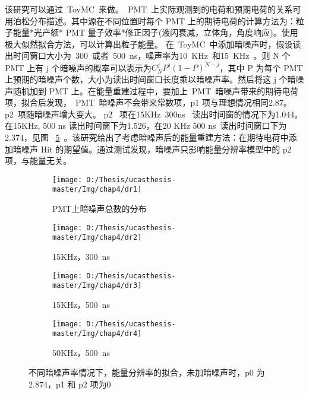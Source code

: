 该研究可以通过~ToyMC~来做。~PMT~上实际观测到的电荷和预期电荷的关系可用泊松分布描述。其中源在不同位置时每个 PMT 上的期待电荷的计算方法为：粒子能量*光产额* PMT 量子效率*修正因子(液闪衰减，立体角，角度响应)。使用极大似然拟合方法，可以计算出粒子能量。
在~ToyMC~中添加暗噪声时，假设读出时间窗口大小为~300~或者~500~ns，噪声率为10~KHz~和15~KHz~。则 N 个 PMT 上有 j 个暗噪声的概率可以表示为$C_N^jP^j(1-P)^{N-j}$，其中 P 为每个 PMT 上预期的暗噪声个数，大小为读出时间窗口长度乘以暗噪声率。然后将这 j 个暗噪声随机加到 PMT 上。在能量重建过程中，要加上~PMT~暗噪声带来的期待电荷项，拟合后发现，~PMT~暗噪声不会带来常数项，p1 项与理想情况相同2.87。 p2~项随暗噪声增大变大。 p2~ 项在15KHz~300ns~ 读出时间窗的情况下为1.044。在15KHz, 500 ns 读出时间窗下为1.526，在20 KHz 500 ns~读出时间窗口下为2.374，见图 ~\ref{fig:dr}~。该研究给出了考虑暗噪声后的能量重建方法：在期待电荷中添加暗噪声 Hit 的期望值。通过测试发现，暗噪声只影响能量分辨率模型中的 p2 项，与能量无关。
 \begin{figure}[!htbp]
  \centering
  \begin{subfigure}[b]{\MySubFactor\textwidth}
    \texttt{[image: D:/Thesis/ucasthesis-master/Img/chap4/dr1]}
    \caption{%
    PMT上暗噪声总数的分布}
    \label{fig:dr_1}
  \end{subfigure}%
  \quad\quad\quad\quad\quad\quad%
  \begin{subfigure}[b]{\MySubFactor\textwidth}
    \texttt{[image: D:/Thesis/ucasthesis-master/Img/chap4/dr2]}
    \caption{15KHz，300~ns~}
    \label{fig:dr_2}
  \end{subfigure}
  \begin{subfigure}[b]{\MySubFactor\textwidth}
    \texttt{[image: D:/Thesis/ucasthesis-master/Img/chap4/dr3]}
    \caption{15KHz，500~ns~}
    \label{fig:dr_3}
  \end{subfigure}%
  \quad\quad\quad\quad\quad\quad%
  \begin{subfigure}[b]{\MySubFactor\textwidth}
    \texttt{[image: D:/Thesis/ucasthesis-master/Img/chap4/dr4]}
    \caption{50KHz，500~ns~}
    \label{fig:dr_4}
  \end{subfigure}
  \caption{不同暗噪声率情况下，能量分辨率的拟合，未加暗噪声时，p0 为2.874，p1 和 p2 项为0 }
  \label{fig:dr}
\end{figure}
